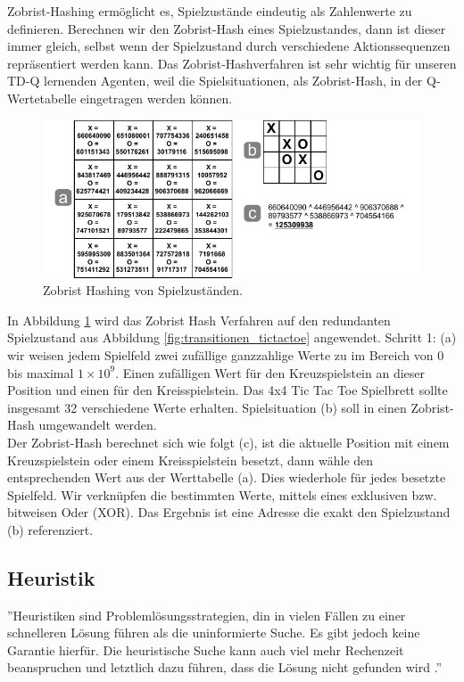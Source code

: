 Zobrist-Hashing ermöglicht es, Spielzustände eindeutig als Zahlenwerte zu definieren. Berechnen wir den Zobrist-Hash eines Spielzustandes, dann ist dieser immer gleich, selbst wenn der Spielzustand durch verschiedene Aktionssequenzen repräsentiert werden kann. Das Zobrist-Hashverfahren ist sehr wichtig für unseren TD-Q lernenden Agenten, weil die Spielsituationen, als Zobrist-Hash, in der Q-Wertetabelle eingetragen werden können.

\begin{figure}[!htbp]
  \centering
  \includegraphics[scale = 1.3]{inhalt/abbildungen/zobrist_hash_tictactoe.pdf}
  \caption{Zobrist Hashing von Spielzuständen.}
  \label{fig:zobrist_hash_tictactoe}
\end{figure} 


In Abbildung \ref{fig:zobrist_hash_tictactoe} wird das Zobrist Hash Verfahren auf den redundanten Spielzustand aus Abbildung \ref{fig:transitionen_tictactoe} angewendet. Schritt 1: (a) wir weisen jedem Spielfeld zwei zufällige ganzzahlige Werte zu im Bereich von 0 bis maximal $1 \times 10^{9}$. Einen zufälligen Wert für den Kreuzspielstein an dieser Position und einen für den Kreisspielstein. Das 4x4 Tic Tac Toe Spielbrett sollte insgesamt 32 verschiedene Werte erhalten. Spielsituation (b) soll in einen Zobrist-Hash umgewandelt werden. \\

Der Zobrist-Hash berechnet sich wie folgt (c), ist die aktuelle Position mit einem Kreuzspielstein oder einem Kreisspielstein besetzt, dann wähle den entsprechenden Wert aus der Werttabelle (a). Dies wiederhole für jedes besetzte Spielfeld. Wir verknüpfen die bestimmten Werte, mittels eines exklusiven bzw. bitweisen Oder (XOR). Das Ergebnis ist eine Adresse die exakt den Spielzustand (b) referenziert. \\

\subsection{Heuristik}
\label{subsec:Heuristik}
''Heuristiken sind Problemlösungsstrategien, din in vielen Fällen zu einer schnelleren Lösung führen als die uninformierte Suche. Es gibt jedoch keine Garantie hierfür. Die heuristische Suche kann auch viel mehr Rechenzeit beanspruchen und letztlich dazu führen, dass die Lösung nicht gefunden wird \cite[105]{Ertel}.''\\

